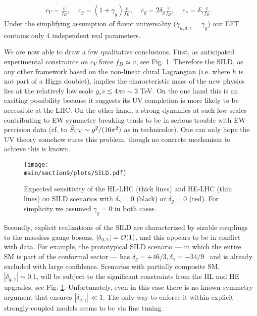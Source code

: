 \begin{eqnarray}\label{4parSILD}
c_V=\frac{v}{f_D},~~~~~c_y=(1+\gamma_y)\frac{v}{f_D},~~~~~c_g=2\delta_g\frac{v}{f_D},~~~~~c_\gamma=\delta_\gamma\frac{v}{f_D}.
\end{eqnarray}
Under the simplifying assumption of flavor universality ($\gamma_{u,d,e}=\gamma_y$) our EFT contains only 4 independent real parameters. %


We are now able to draw a few qualitative conclusions. First, as anticipated experimental constraints on $c_V$ force $f_D\simeq v$, see Fig. \ref{SILD}. Therefore the SILD, as any other framework based on the non-linear chiral Lagrangian (i.e. where $h$ is not part of a Higgs doublet), implies the characteristic mass of the new physics lies at the relatively low scale $g_*v\lesssim4\pi v\sim3$ TeV. On the one hand this is an exciting possibility because it suggests its UV completion is more likely to be accessible at the LHC. On the other hand, a strong dynamics at such low scales contributing to EW symmetry breaking tends to be in serious trouble with EW precision data (cf. to $\widehat S_{\rm UV}\sim g^2/(16\pi^2)$ as in technicolor). One can only hope the UV theory somehow cures this problem, though no concrete mechanism to achieve this is known.


\begin{figure}[t]
\begin{center}
\texttt{[image: \\main/section9/plots/SILD.pdf]}
\caption{Expected sensitivity of the HL-LHC (thick lines) and HE-LHC (thin lines) on SILD scenarios with $\delta_\gamma=0$ (black) or $\delta_g=0$ (red). For simplicity we assumed $\gamma_y=0$ in both cases.
}\label{SILD}
\end{center}
\end{figure}


Secondly, explicit realizations of the SILD are characterized by sizable couplings to the massless gauge bosons, $|\delta_{g,\gamma}|={\cal O}(1)$, and this appears to be in conflict with data. For example, the prototypical SILD scenario --- in which the entire SM is part of the conformal sector --- has $\delta_{g}=+46/3, \delta_\gamma=-34/9$~\cite{Goldberger:2008zz} and is already excluded with large confidence. Scenarios with partially composite SM, $|\delta_{g,\gamma}|\sim0.1$, will be subject to the significant constraints from the HL and HE upgrades, see Fig. \ref{SILD}. Unfortunately, even in this case there is no known symmetry argument that ensures $|\delta_{g,\gamma}|\ll1$. The only way to enforce it within explicit strongly-coupled models seems to be via fine tuning.



